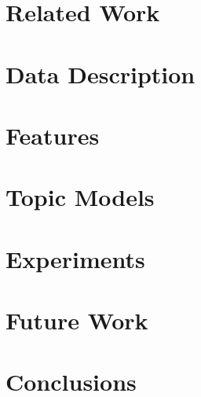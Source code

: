 \documentclass[a4paper,10pt,twoside]{report}
\begin{document}
\clearemptydoublepage

\chapter{Related Work}\label{chapter:related_work}


\clearemptydoublepage

\chapter{Data Description}\label{chapter:data_description}


\clearemptydoublepage

\chapter{Features}\label{chapter:features}


\clearemptydoublepage

\chapter{Topic Models}\label{chapter:topic_models}


\clearemptydoublepage

\chapter{Experiments}\label{chapter:experiments}


\clearemptydoublepage

\chapter{Future Work}\label{chapter:future_work}


\clearemptydoublepage

\chapter{Conclusions}\label{chapter:conclusions}


\clearemptydoublepage

%



% 
% 
% 
\end{document}
